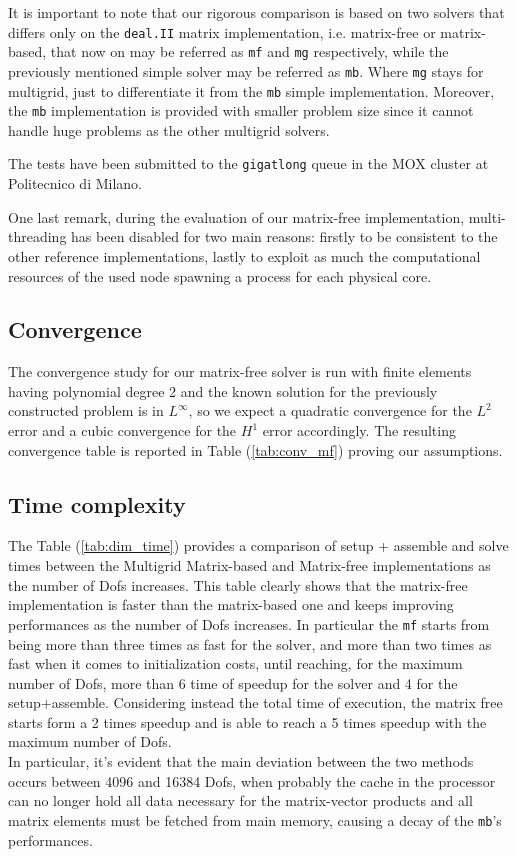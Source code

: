 \documentclass{article}
\begin{document}
It is important to note that our rigorous comparison is based on two solvers that differs only on the \verb|deal.II| matrix implementation, i.e. matrix-free or matrix-based, that now on may be referred as \verb|mf| and \verb|mg| respectively, while the previously mentioned simple solver may be referred as \verb|mb|. Where \verb|mg| stays for multigrid, just to differentiate it from the \verb|mb| simple implementation. Moreover, the \verb|mb| implementation is provided with smaller problem size since it cannot handle huge problems as the other multigrid solvers.

The tests have been submitted to the \verb|gigatlong| queue in the MOX cluster at Politecnico di Milano.

One last remark, during the evaluation of our matrix-free implementation, multi-threading has been disabled for two main reasons: firstly to be consistent to the other reference implementations, lastly to exploit as much the computational resources of the used node spawning a process for each physical core.


\subsection{Convergence}
The convergence study for our matrix-free solver is run with finite elements having polynomial degree 2 and the known solution for the previously constructed problem is in \(L^\infty\), so we expect a quadratic convergence for the \(L^2\) error and a cubic convergence for the \(H^1\) error accordingly. The resulting convergence table is reported in Table (\ref{tab:conv_mf}) proving our assumptions. 



\subsection{Time complexity}

The Table (\ref{tab:dim_time}) provides a comparison of setup + assemble and solve times between the Multigrid Matrix-based and Matrix-free implementations as the number of Dofs increases. This table clearly shows that the matrix-free implementation is faster than the matrix-based one and keeps improving performances as the number of Dofs increases. In particular the \verb|mf| starts from being more than three times as fast for the solver, and more than two times as fast when it comes to initialization costs, until reaching, for the maximum number of Dofs, more than 6 time of speedup for the solver and 4 for the setup+assemble. Considering instead the total time of execution, the matrix free starts form a 2 times speedup and is able to reach a 5 times speedup with the maximum number of Dofs.\\
 In particular, it's evident that the main deviation between the two methods occurs between 4096 and 16384 Dofs, when probably the cache in the processor can no longer hold all data necessary for the matrix-vector products and all matrix elements must be fetched from main memory, causing a decay of the \verb|mb|'s performances.
\end{document}
